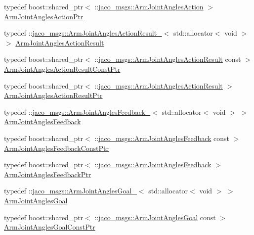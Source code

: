 \begin{DoxyCompactItemize}
\item 
typedef boost\+::shared\+\_\+ptr$<$ \+::\hyperlink{namespacejaco__msgs_afc04c716621af8a0dfe0968d1db0f90c}{jaco\+\_\+msgs\+::\+Arm\+Joint\+Angles\+Action} $>$ \hyperlink{namespacejaco__msgs_a727d8133fbee8f488ca93cd6e8053e95}{Arm\+Joint\+Angles\+Action\+Ptr}
\item 
typedef \+::\hyperlink{structjaco__msgs_1_1ArmJointAnglesActionResult__}{jaco\+\_\+msgs\+::\+Arm\+Joint\+Angles\+Action\+Result\+\_\+}$<$ std\+::allocator$<$ void $>$ $>$ \hyperlink{namespacejaco__msgs_a575d1947e16ac78511c74fc00dc8006a}{Arm\+Joint\+Angles\+Action\+Result}
\item 
typedef boost\+::shared\+\_\+ptr$<$ \+::\hyperlink{namespacejaco__msgs_a575d1947e16ac78511c74fc00dc8006a}{jaco\+\_\+msgs\+::\+Arm\+Joint\+Angles\+Action\+Result} const  $>$ \hyperlink{namespacejaco__msgs_a9fed6803f229ee175ae5078fdc8327fe}{Arm\+Joint\+Angles\+Action\+Result\+Const\+Ptr}
\item 
typedef boost\+::shared\+\_\+ptr$<$ \+::\hyperlink{namespacejaco__msgs_a575d1947e16ac78511c74fc00dc8006a}{jaco\+\_\+msgs\+::\+Arm\+Joint\+Angles\+Action\+Result} $>$ \hyperlink{namespacejaco__msgs_aa05f56804913edb95541044daf226bd2}{Arm\+Joint\+Angles\+Action\+Result\+Ptr}
\item 
typedef \+::\hyperlink{structjaco__msgs_1_1ArmJointAnglesFeedback__}{jaco\+\_\+msgs\+::\+Arm\+Joint\+Angles\+Feedback\+\_\+}$<$ std\+::allocator$<$ void $>$ $>$ \hyperlink{namespacejaco__msgs_a4a089d2dddd537667698d8700c9fe4b8}{Arm\+Joint\+Angles\+Feedback}
\item 
typedef boost\+::shared\+\_\+ptr$<$ \+::\hyperlink{namespacejaco__msgs_a4a089d2dddd537667698d8700c9fe4b8}{jaco\+\_\+msgs\+::\+Arm\+Joint\+Angles\+Feedback} const  $>$ \hyperlink{namespacejaco__msgs_afc8d8b7d636be616ec74d75c13b205ce}{Arm\+Joint\+Angles\+Feedback\+Const\+Ptr}
\item 
typedef boost\+::shared\+\_\+ptr$<$ \+::\hyperlink{namespacejaco__msgs_a4a089d2dddd537667698d8700c9fe4b8}{jaco\+\_\+msgs\+::\+Arm\+Joint\+Angles\+Feedback} $>$ \hyperlink{namespacejaco__msgs_a7739c7db7b7ff6bab624e54d08c5d7fb}{Arm\+Joint\+Angles\+Feedback\+Ptr}
\item 
typedef \+::\hyperlink{structjaco__msgs_1_1ArmJointAnglesGoal__}{jaco\+\_\+msgs\+::\+Arm\+Joint\+Angles\+Goal\+\_\+}$<$ std\+::allocator$<$ void $>$ $>$ \hyperlink{namespacejaco__msgs_a5ae3531b112ac4b78145e9ab10e9a8fa}{Arm\+Joint\+Angles\+Goal}
\item 
typedef boost\+::shared\+\_\+ptr$<$ \+::\hyperlink{namespacejaco__msgs_a5ae3531b112ac4b78145e9ab10e9a8fa}{jaco\+\_\+msgs\+::\+Arm\+Joint\+Angles\+Goal} const  $>$ \hyperlink{namespacejaco__msgs_a9056d2fb29e6973f6db43a60138ffc7c}{Arm\+Joint\+Angles\+Goal\+Const\+Ptr}

\end{DoxyCompactItemize}
